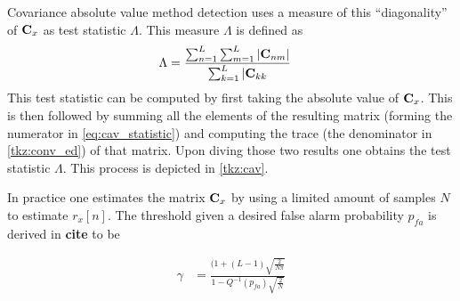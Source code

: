 \documentclass[a4paper, openany, oneside]{memoir}
\begin{document}
Covariance absolute value method detection uses a measure of this ``diagonality'' of $\boldsymbol{\mathbf{C}}_x$ as test statistic $\Lambda$.
This measure $\Lambda$ is defined as
\begin{align}\label{eq:cav_statistic}
\Lambda &= \frac{\sum_{n=1}^{L} \sum_{m=1}^L \left|\boldsymbol{\mathbf{C}}_{nm}\right|}{\sum_{k=1}^L |\boldsymbol{\mathbf{C}}_{kk}}
\end{align} 
This test statistic can be computed by first taking the absolute value of $\boldsymbol{\mathbf{C}}_x$. This is then followed by summing all the elements of the resulting matrix (forming the numerator in \cref{eq:cav_statistic}) and computing the trace (the denominator in \cref{tkz:conv_ed}) of that matrix. Upon diving those two results one obtains the test statistic $\Lambda$. This process is depicted in \cref{tkz:cav}.

In practice one estimates the matrix $\boldsymbol{\mathbf{C}}_x$ by using a limited amount of samples $N$ to estimate $r_x[n]$. The threshold given a desired false alarm probability
$p_{fa}$ is derived in \textbf{cite} to be

\begin{align*}
\gamma &= \frac{(1+(L-1)\sqrt{\frac{2}{N\pi}}}{1-Q^{-1}(p_{fa})\sqrt{\frac{2}{N}}}
\end{align*} 
\end{document}

